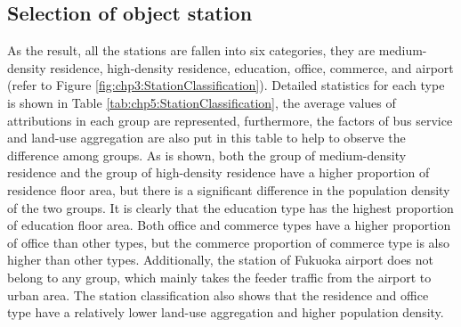 \subsection{Selection of object station}
%
As the result, all the stations are fallen into six categories, they are medium-density residence, high-density residence, education, office, commerce, and airport (refer to Figure \ref{fig:chp3:StationClassification}). Detailed statistics for each type is shown in Table \ref{tab:chp5:StationClassification}, the average values of attributions in each group are represented, furthermore, the factors of bus service and land-use aggregation are also put in this table to help to observe the difference among groups. As is shown, both the group of medium-density residence and the group of high-density residence have a higher proportion of residence floor area, but there is a significant difference in the population density of the two groups. It is clearly that the education type has the highest proportion of education floor area. Both office and commerce types have a higher proportion of office than other types, but the commerce proportion of commerce type is also higher than other types. Additionally, the station of Fukuoka airport does not belong to any group, which mainly takes the feeder traffic from the airport to urban area. The station classification also shows that the residence and office type have a relatively lower land-use aggregation and higher population density.

